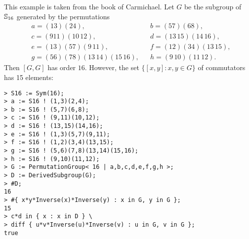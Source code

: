\begin{example}
This example is taken from the book \cite{MR0075938} of Carmichael. 
Let $G$ be the subgroup of $\mathbb{S}_{16}$ generated by the permutations
\begin{align*}
&a = (1 3)(2 4),&&
b = (5 7)(6 8),\\
&c = (9 11)(10\,12),&&
d = (13\,15)(14\,16),\\
&e = (1 3)(5 7)(9\,11),&&
f = (1 2)(3 4)(13\,15),\\
&g = (5 6)(7 8)(13\,14)(15\,16),&&
h =(9\,10)(11\,12).
\end{align*}
Then $[G,G]$ has order $16$. However, 
the set $\{[x,y]:x,y\in G\}$ of commutators has 15 elements:
\begin{lstlisting}
> S16 := Sym(16);
> a := S16 ! (1,3)(2,4);
> b := S16 ! (5,7)(6,8);
> c := S16 ! (9,11)(10,12);
> d := S16 ! (13,15)(14,16);
> e := S16 ! (1,3)(5,7)(9,11);
> f := S16 ! (1,2)(3,4)(13,15);
> g := S16 ! (5,6)(7,8)(13,14)(15,16);
> h := S16 ! (9,10)(11,12);
> G := PermutationGroup< 16 | a,b,c,d,e,f,g,h >;
> D := DerivedSubgroup(G);
> #D;
16
> #{ x*y*Inverse(x)*Inverse(y) : x in G, y in G };
15
> c*d in { x : x in D } \
> diff { u*v*Inverse(u)*Inverse(v) : u in G, v in G };
true
\end{lstlisting}







   




\end{example}


